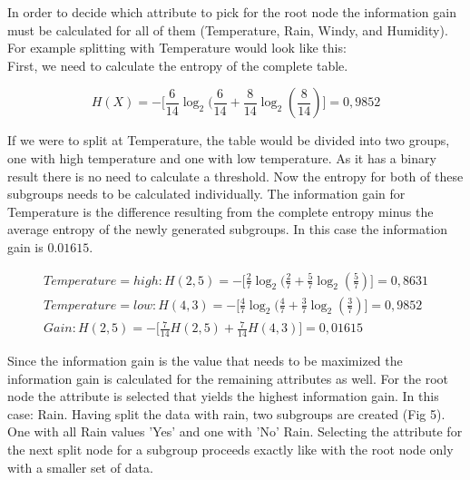 \documentclass[
12pt,
headsepline,
bibliography=totoc,
twoside=semi,
fleqn
]{scrartcl}
\begin{document}
 
 In order to decide which attribute to pick for the root node the information gain must be calculated for all of them (Temperature, Rain, Windy, and Humidity). For example splitting with Temperature would look like this: \\

 First, we need to calculate the entropy of the complete table. 

\begin{equation}\label{fig:fig8}
   H(X)= - \biggl[\frac{6}{14}\log_2(\frac{6}{14}+\frac{8}{14}\log_2(\frac{8}{14})\biggr]=0,9852
\end{equation}  

 If we were to split at Temperature, the table would be divided into two groups, one with high temperature and one with low temperature. As it has a binary result there is no need to calculate a threshold. Now the entropy for both of these subgroups needs to be calculated individually. The information gain for Temperature is the difference resulting from the complete entropy minus the average entropy of the newly generated subgroups. In this case the information gain is $0.01615$. 

 \begin{equation}\label{fig:fig7}
   \begin{split}
   Temperature=high: H(2,5)= -\biggl[\frac{2}{7}\log_2(\frac{2}{7}+\frac{5}{7}\log_2(\frac{5}{7})\biggr]=0,8631
   \\
   Temperature=low: H(4,3)= -\biggl[\frac{4}{7}\log_2(\frac{4}{7}+\frac{3}{7}\log_2(\frac{3}{7})\biggr]=0,9852
   \\
   Gain: H(2,5)= -\biggl[\frac{7}{14}H(2,5)+\frac{7}{14}H(4,3)\biggr]=0,01615
\end{split}
\end{equation}  

Since the information gain is the value that needs to be maximized the information gain is calculated for the remaining attributes as well. For the root node the attribute is selected that yields the highest information gain. In this case: Rain. 
Having split the data with rain, two subgroups are created (Fig 5). One with all Rain values 'Yes' and one with 'No' Rain. Selecting the attribute for the next split node for a subgroup proceeds exactly like with the root node only with a smaller set of data.
\end{document}
